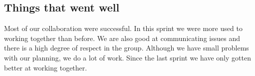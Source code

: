 \subsection{Things that went well}
Most of our collaboration were successful. In this sprint we were more used to working together than before. We are also good at communicating issues and there is a high degree of respect in the group. Although we have small problems with our planning, we do a lot of work. Since the last sprint we have only gotten better at working together.
